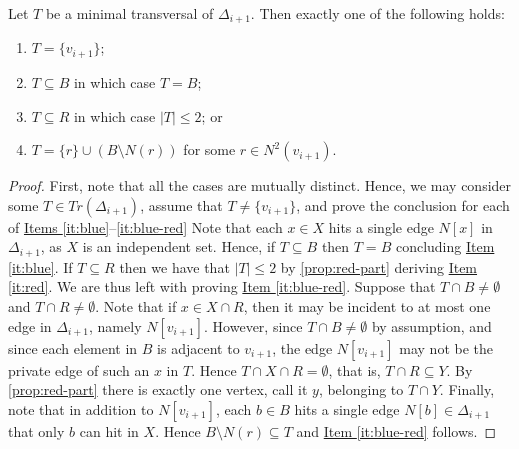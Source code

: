 \begin{lemma}\label{lem:extension-characterization}
    Let $T$ be a minimal transversal of $\Delta_{i+1}$.
    Then exactly one of the following holds:
    \begin{enumerate}
        \item\label{it:vi} \(T = \{v_{i+1}\}\); 
        \item\label{it:blue} \(T \subseteq B\) in which case $T=B$; 
        \item\label{it:red} \(T \subseteq R\) in which case \(|T| \leq 2\); or
        \item\label{it:blue-red} \(T = \{r\} \cup (B \setminus N(r))\) for some \(r \in N^{2}(v_{i+1})\).
    \end{enumerate}

    
    \begin{proof}
        First, note that all the cases are mutually distinct.
        Hence, we may consider some $T\in Tr(\Delta_{i+1})$, assume that $T\neq \{v_{i+1}\}$, and prove the conclusion for each of 
        \hyperref[it:blue]{Items \ref*{it:blue}}--\ref{it:blue-red} 
        Note that each $x\in X$ hits a single edge $N[x]$ in $\Delta_{i+1}$, as $X$ is an independent set.
        Hence, if $T\subseteq B$ then $T=B$ concluding \hyperref[it:blue]{Item \ref*{it:blue}}.
        If $T\subseteq R$ then we have that $|T| \leq 2$ by \autoref{prop:red-part} deriving \hyperref[it:red]{Item \ref*{it:red}}.
        We are thus left with proving \hyperref[it:blue]{Item \ref*{it:blue-red}}.
        Suppose that \( T \cap B \neq \emptyset\) and \(T \cap R \neq \emptyset\).  
        Note that if $x\in X\cap R$, then it may be incident to at most one edge in $\Delta_{i+1}$, namely $N[v_{i+1}]$.
        However, since \(T \cap B \neq \emptyset\) by assumption, and since each element in $B$ is adjacent to $v_{i+1}$, the edge $N[v_{i+1}]$ may not be the private edge of such an $x$ in $T$.
        Hence $T\cap X\cap R=\emptyset$, that is, $T\cap R\subseteq Y$.
        By \autoref{prop:red-part} there is exactly one vertex, call it $y$, belonging to $T\cap Y$.
        Finally, note that in addition to $N[v_{i+1}]$, each \(b \in B\) hits a single edge \(N[b] \in \Delta_{i+1}\) that only $b$ can hit in $X$.
        Hence \(B \setminus N(r) \subseteq T\) and \hyperref[it:blue-red]{Item \ref*{it:blue-red}} follows.
    \end{proof}
\end{lemma}

